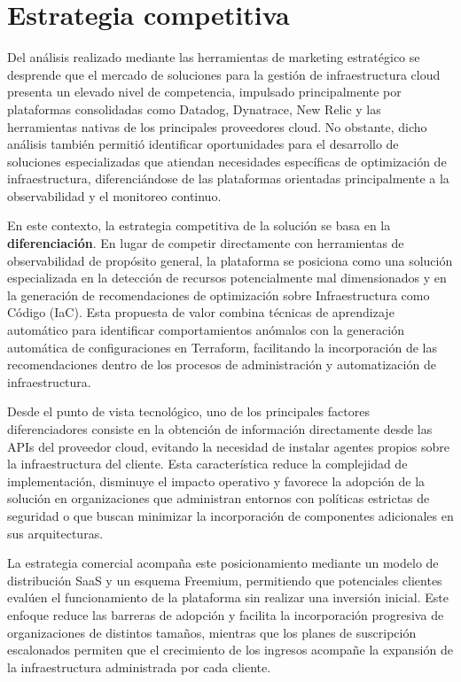 \section{Estrategia competitiva}

Del análisis realizado mediante las herramientas de marketing estratégico se desprende que el mercado de soluciones para la gestión de infraestructura cloud presenta un elevado nivel de competencia, impulsado principalmente por plataformas consolidadas como Datadog, Dynatrace, New Relic y las herramientas nativas de los principales proveedores cloud. No obstante, dicho análisis también permitió identificar oportunidades para el desarrollo de soluciones especializadas que atiendan necesidades específicas de optimización de infraestructura, diferenciándose de las plataformas orientadas principalmente a la observabilidad y el monitoreo continuo.

En este contexto, la estrategia competitiva de la solución se basa en la \textbf{diferenciación}. En lugar de competir directamente con herramientas de observabilidad de propósito general, la plataforma se posiciona como una solución especializada en la detección de recursos potencialmente mal dimensionados y en la generación de recomendaciones de optimización sobre Infraestructura como Código (IaC). Esta propuesta de valor combina técnicas de aprendizaje automático para identificar comportamientos anómalos con la generación automática de configuraciones en Terraform, facilitando la incorporación de las recomendaciones dentro de los procesos de administración y automatización de infraestructura.

Desde el punto de vista tecnológico, uno de los principales factores diferenciadores consiste en la obtención de información directamente desde las APIs del proveedor cloud, evitando la necesidad de instalar agentes propios sobre la infraestructura del cliente. Esta característica reduce la complejidad de implementación, disminuye el impacto operativo y favorece la adopción de la solución en organizaciones que administran entornos con políticas estrictas de seguridad o que buscan minimizar la incorporación de componentes adicionales en sus arquitecturas.

La estrategia comercial acompaña este posicionamiento mediante un modelo de distribución SaaS y un esquema Freemium, permitiendo que potenciales clientes evalúen el funcionamiento de la plataforma sin realizar una inversión inicial. Este enfoque reduce las barreras de adopción y facilita la incorporación progresiva de organizaciones de distintos tamaños, mientras que los planes de suscripción escalonados permiten que el crecimiento de los ingresos acompañe la expansión de la infraestructura administrada por cada cliente.

